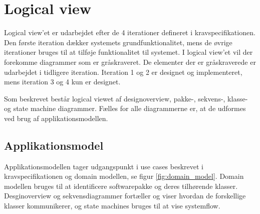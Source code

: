 \section{Logical view}
\vspace{-0.4cm}
Logical view'et er udarbejdet efter de 4 iterationer defineret i kravspecifikationen. Den første iteration dækker systemets grundfunktionalitet, mens de øvrige iterationer bruges til at tilføje funktionalitet til systemet. 
I logical view'et vil der forekomme diagrammer som er gråskraveret. De elementer der er gråskraverede er udarbejdet i tidligere iteration. Iteration 1 og 2 er designet og implementeret, mens iteration 3 og 4 kun er designet.
  
Som beskrevet består logical viewet af designoverview, pakke-, sekvens-, klasse- og state machine diagrammer. Fælles for alle diagrammerne er, at de udformes ved brug af applikationsmodellen.

\subsection{Applikationsmodel}
\vspace{-0.4cm}
Applikationsmodellen tager udgangspunkt i use cases beskrevet i kravspecifikationen og domain modellen, se figur \ref{fig:domain_model}. Domain modellen bruges til at identificere softwarepakke og deres tilhørende klasser. Desginoverview og sekvensdiagrammer fortæller og viser hvordan de forskellige klasser kommunikerer, og state machines bruges til at vise systemflow.




\newpage


\newpage


\newpage

